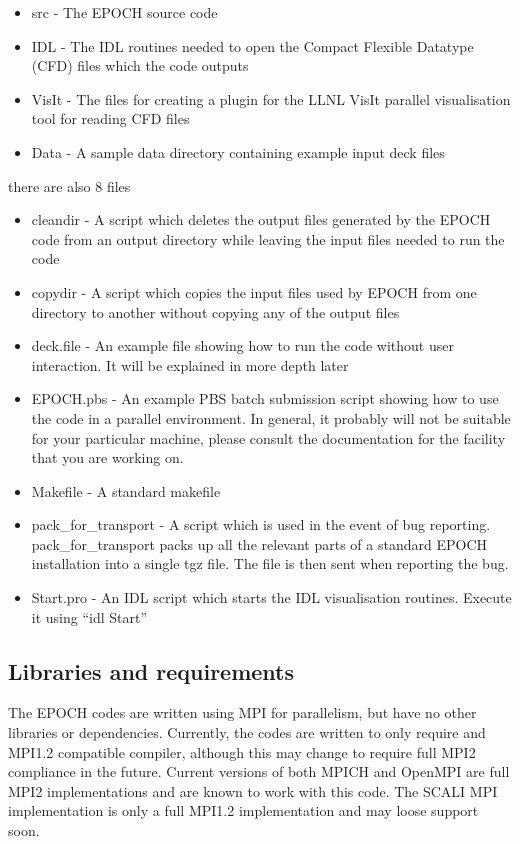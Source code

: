 \documentclass[12pt]{article}
\newcommand{\nEPOCH}{{\color{warwickdark}\fontfamily{phv}\selectfont EPOCH}}
\newcommand{\EPOCH}{{\nEPOCH} }
\begin{document}
\begin{itemize}
\item src - The \EPOCH source code
\item IDL - The IDL routines needed to open the Compact Flexible Datatype
  (CFD) files which the code outputs
\item VisIt - The files for creating a plugin for the LLNL VisIt parallel
  visualisation tool for reading CFD files
\item Data - A sample data directory containing example input deck files
\end{itemize}
there are also 8 files

\begin{itemize}
\item cleandir - A script which deletes the output files generated by the
  \EPOCH code from an output directory while leaving the input files needed to
  run the code
\item copydir - A script which copies the input files used by \EPOCH from one
  directory to another without copying any of the output files
\item deck.file - An example file showing how to run the code without user
  interaction. It will be explained in more depth later
\item EPOCH.pbs - An example PBS batch submission script showing how to use
  the code in a parallel environment. In general, it probably will not be
  suitable for your particular machine, please consult the documentation for
  the facility that you are working on.
\item Makefile - A standard makefile
\item pack\_for\_transport - A script which is used in the event of bug
  reporting. pack\_for\_transport packs up all the relevant parts of a
  standard \EPOCH installation into a single tgz file. The file is then sent
  when reporting the bug.
\item Start.pro - An IDL script which starts the IDL visualisation
  routines. Execute it using ``idl Start''
\end{itemize}

\subsection{Libraries and requirements}
The \EPOCH codes are written using MPI for parallelism, but have no other
libraries or dependencies. Currently, the codes are written to only require and
MPI1.2 compatible compiler, although this may change to require full MPI2
compliance in the future. Current versions of both MPICH and OpenMPI are full
MPI2 implementations and are known to work with this code. The SCALI MPI
implementation is only a full MPI1.2 implementation and may loose support
soon.\\
\end{document}
